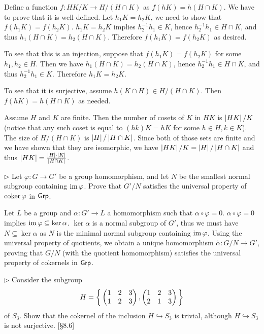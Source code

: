 \begin{solution}
	Define a function $f: HK/K \to H/(H \cap K)$ as $f(hK) = h(H \cap K)$. We have to prove that it is well-defined. Let $h_1 K = h_2 K$, we need to show that $f(h_1 K) = f(h_2 K)$. $h_1 K = h_2 K$ implies $h_2^{-1} h_1 \in K$, hence  $h_2^{-1} h_1 \in H \cap K$, and thus $h_1 (H \cap K) = h_2 (H \cap K)$. Therefore $f(h_1 K) = f(h_2 K)$ as desired.
	
	To see that this is an injection, suppose that $f(h_1 K) = f(h_2 K)$ for some $h_1, h_2 \in H$. Then we have $h_1 (H \cap K) = h_2 (H \cap K)$, hence $h_2^{-1} h_1 \in H \cap K$, and thus $h_2^{-1} h_1 \in K$. Therefore $h_1 K = h_2 K$.
	
	To see that it is surjective, assume $h (K \cap H) \in H/(H \cap K)$. Then $f(h K) = h (H \cap K)$ as needed.
	
	Assume $H$ and $K$ are finite. Then the number of cosets of $K$ in $HK$ is $\left|HK\right|/{K}$ (notice that any such coset is equal to $(hk)K = hK$ for some $h \in H, k \in K$). The size of $H / (H \cap K)$ is $\left|H\right|/\left|H \cap K\right|$. Since both of those sets are finite and we have shown that they are isomorphic, we have $\left|HK\right|/{K} = \left|H\right|/\left|H \cap K\right|$ and thus $\left|HK\right| = \frac{\left|H\right| \cdot \left|K\right|}{\left|H \cap K\right|}$.
\end{solution}

\begin{problem}
	$\triangleright$ Let $\varphi: G \to G'$ be a group homomorphism, and let $N$ be the smallest normal subgroup containing $\operatorname{im} \varphi$. Prove that $G'/N$ satisfies the universal property of $\operatorname{coker} \varphi$ in $\mathsf{Grp}$.
\end{problem}

\begin{solution}
	Let $L$ be a group and $\alpha: G' \to L$ a homomorphism such that $\alpha \circ \varphi = 0$. $\alpha \circ \varphi = 0$ implies $\operatorname{im} \varphi \subseteq \ker \alpha$. $\ker \alpha$ is a normal subgroup of $G'$, thus we must have $N \subseteq \ker \alpha$ as $N$ is the minimal normal subgroup containing $\operatorname{im} \varphi$. Using the universal property of quotients, we obtain a unique homomorphism $\tilde{\alpha}: G/N \to G'$, proving that $G/N$ (with the quotient homomorphism) satisfies the universal property of cokernels in $\mathsf{Grp}$.
\end{solution}

\begin{problem}
	$\triangleright$ Consider the subgroup
	\[
		H = \left\{\,
			\begin{pmatrix}
				1 & 2 & 3 \\
				1 & 2 & 3
			\end{pmatrix},
			\begin{pmatrix}
				1 & 2 & 3 \\
				2 & 1 & 3
			\end{pmatrix}
		\,\right\}
	\]
	of $S_3$. Show that the cokernel of the inclusion $H \hookrightarrow S_3$ is trivial, although $H \hookrightarrow S_3$ is not surjective. [\S8.6]
\end{problem}

